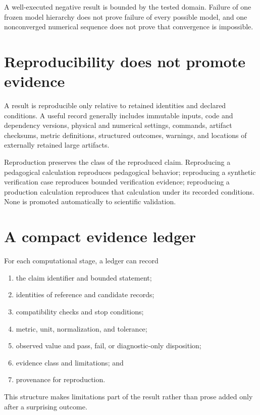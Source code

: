 A well-executed negative result is bounded by the tested domain. Failure of one
frozen model hierarchy does not prove failure of every possible model, and one
nonconverged numerical sequence does not prove that convergence is impossible.

\section{Reproducibility does not promote evidence}

A result is reproducible only relative to retained identities and declared
conditions. A useful record generally includes immutable inputs, code and
dependency versions, physical and numerical settings, commands, artifact
checksums, metric definitions, structured outcomes, warnings, and locations of
externally retained large artifacts.

Reproduction preserves the class of the reproduced claim. Reproducing a
pedagogical calculation reproduces pedagogical behavior; reproducing a
synthetic verification case reproduces bounded verification evidence;
reproducing a production calculation reproduces that calculation under its
recorded conditions. None is promoted automatically to scientific validation.

\section{A compact evidence ledger}

For each computational stage, a ledger can record

\begin{enumerate}
  \item the claim identifier and bounded statement;
  \item identities of reference and candidate records;
  \item compatibility checks and stop conditions;
  \item metric, unit, normalization, and tolerance;
  \item observed value and pass, fail, or diagnostic-only disposition;
  \item evidence class and limitations; and
  \item provenance for reproduction.
\end{enumerate}

This structure makes limitations part of the result rather than prose added
only after a surprising outcome.

